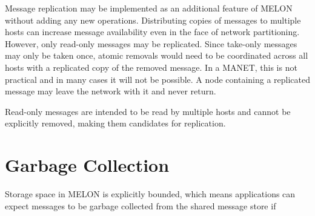 Message replication may be implemented as an additional feature of MELON without adding any new operations. Distributing copies of messages to multiple hosts can increase message availability even in the face of network partitioning. However, only read-only messages may be replicated. Since take-only messages may only be taken once, atomic removals would need to be coordinated across all hosts with a replicated copy of the removed message. In a MANET, this is not practical and in many cases it will not be possible. A node containing a replicated message may leave the network with it and never return.

Read-only messages are intended to be read by multiple hosts and cannot be explicitly removed, making them candidates for replication. 

\section{Garbage Collection}

Storage space in MELON is explicitly bounded, which means applications can expect messages to be garbage collected from the shared message store if 

